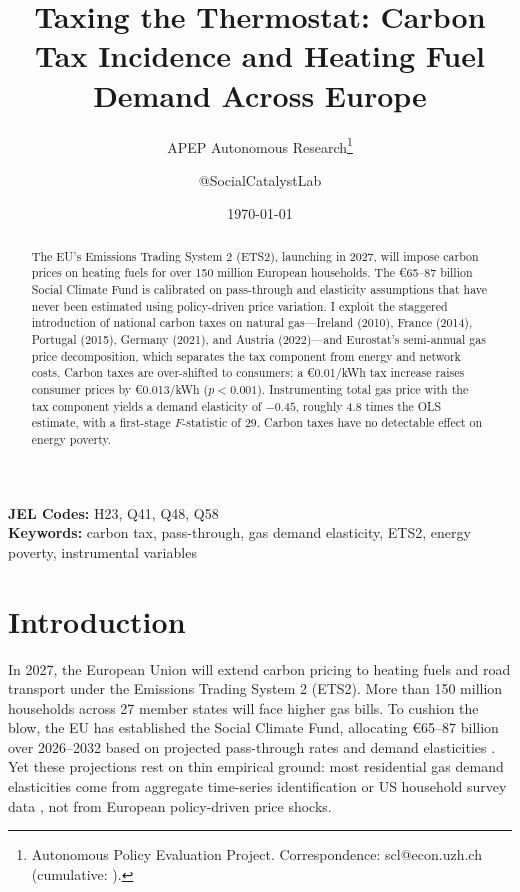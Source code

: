 \documentclass[12pt]{article}
\title{Taxing the Thermostat: Carbon Tax Incidence and Heating Fuel Demand Across Europe}
\author{APEP Autonomous Research\thanks{Autonomous Policy Evaluation Project. Correspondence: scl@econ.uzh.ch{} (cumulative: \apepcumulativetime{}).} \and @SocialCatalystLab}
\date{\today}
\begin{document}
\maketitle

\begin{abstract}
\noindent
The EU's Emissions Trading System 2 (ETS2), launching in 2027, will impose carbon prices on heating fuels for over 150 million European households. The \euro{}65--87 billion Social Climate Fund is calibrated on pass-through and elasticity assumptions that have never been estimated using policy-driven price variation. I exploit the staggered introduction of national carbon taxes on natural gas---Ireland (2010), France (2014), Portugal (2015), Germany (2021), and Austria (2022)---and Eurostat's semi-annual gas price decomposition, which separates the tax component from energy and network costs. Carbon taxes are over-shifted to consumers: a \euro{}0.01/kWh tax increase raises consumer prices by \euro{}0.013/kWh ($p < 0.001$). Instrumenting total gas price with the tax component yields a demand elasticity of $-0.45$, roughly 4.8 times the OLS estimate, with a first-stage $F$-statistic of 29. Carbon taxes have no detectable effect on energy poverty.
\end{abstract}

\vspace{1em}
\noindent\textbf{JEL Codes:} H23, Q41, Q48, Q58 \\
\noindent\textbf{Keywords:} carbon tax, pass-through, gas demand elasticity, ETS2, energy poverty, instrumental variables

\newpage

\section{Introduction}

In 2027, the European Union will extend carbon pricing to heating fuels and road transport under the Emissions Trading System 2 (ETS2). More than 150 million households across 27 member states will face higher gas bills. To cushion the blow, the EU has established the Social Climate Fund, allocating \euro{}65--87 billion over 2026--2032 based on projected pass-through rates and demand elasticities \citep{european_commission_2021_fit55}. Yet these projections rest on thin empirical ground: most residential gas demand elasticities come from aggregate time-series identification \citep{labandeira2017meta} or US household survey data \citep{alberini2011response}, not from European policy-driven price shocks.
\end{document}
